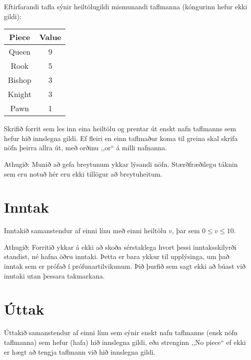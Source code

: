 
Eftirfarandi tafla sýnir heiltölugildi mismunandi taflmanna (kóngurinn hefur ekki gildi):

\begin{center}
\begin{tabular}{ |c|c| }
\hline
\textbf{Piece} & \textbf{Value} \\ 
\hline
Queen & 9 \\ 
Rook & 5 \\ 
Bishop & 3 \\
Knight & 3 \\
Pawn & 1 \\
\hline
\end{tabular}
\end{center}

Skrifið forrit sem les inn eina heiltölu og prentar út enskt nafn taflmanns sem hefur hið innslegna gildi.
Ef fleiri en einn taflmaður koma til greina skal skrifa nöfn þeirra allra út, með orðinu ,,or`` á milli nafnanna.

Athugið: Munið að gefa breytunum ykkar lýsandi nöfn.
Stærðfræðilegu táknin sem eru notuð hér eru ekki tillögur að breytuheitum.

\section*{Inntak}
Inntakið samanstendur af einni línu með einni heiltölu $v$, þar sem $0 \leq v \leq 10$.

Athugið: Forritið ykkar á ekki að skoða sérstaklega hvort þessi inntaksskilyrði standist, né hafna öðru inntaki.
Þetta er bara ykkur til upplýsinga, um það inntak sem er prófað í prófunartilvikunum.
Þið þurfið sem sagt ekki að búast við inntaki utan þessara takmarkana.

\section*{Úttak}
Úttakið samanstendur af einni línu sem sýnir enskt nafn taflmanns (ensk nöfn taflmanna) sem hefur (hafa) hið innslegna gildi,
eða strenginn ,,No piece`` ef ekki er hægt að tengja taflmann við hið innslegna gildi.
